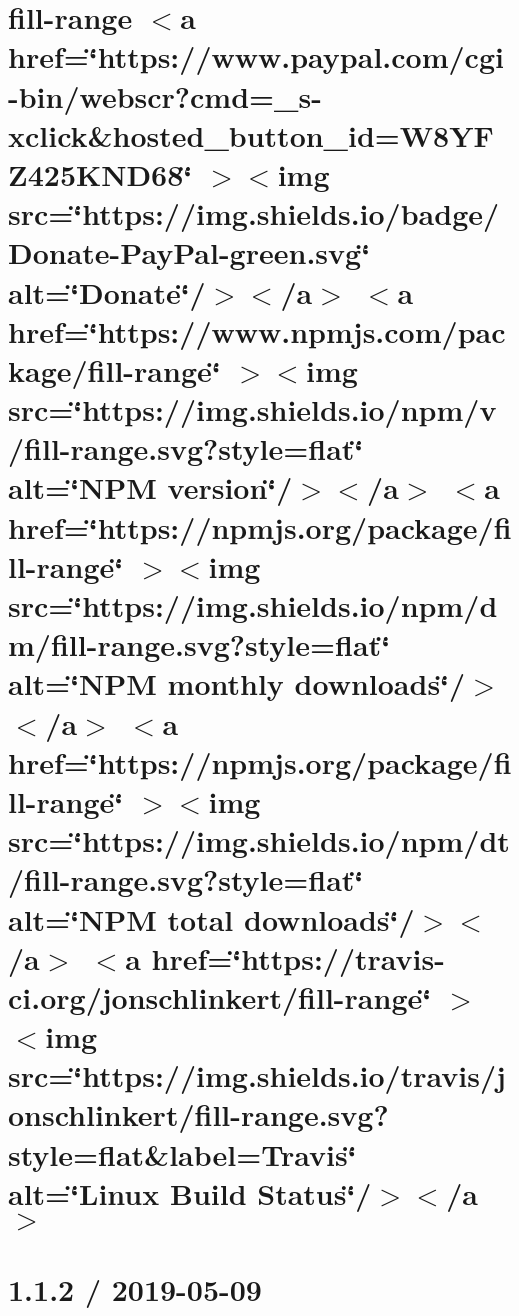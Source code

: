 \documentclass[twoside]{book}
\newcommand{\+}{\discretionary{\mbox{\scriptsize$\hookleftarrow$}}{}{}}
\begin{document}
\chapter{fill-\/range \texorpdfstring{$<$}{<}a href=\char`\"{}https\+://www.\+paypal.\+com/cgi-\/bin/webscr?cmd=\+\_\+s-\/xclick\&hosted\+\_\+button\+\_\+id=\+W8\+YFZ425\+KND68\char`\"{} \texorpdfstring{$>$}{>}\texorpdfstring{$<$}{<}img src=\char`\"{}https\+://img.\+shields.\+io/badge/\+Donate-\/\+Pay\+Pal-\/green.\+svg\char`\"{} alt=\char`\"{}\+Donate\char`\"{}/\texorpdfstring{$>$}{>}\texorpdfstring{$<$}{<}/a\texorpdfstring{$>$}{>} \texorpdfstring{$<$}{<}a href=\char`\"{}https\+://www.\+npmjs.\+com/package/fill-\/range\char`\"{} \texorpdfstring{$>$}{>}\texorpdfstring{$<$}{<}img src=\char`\"{}https\+://img.\+shields.\+io/npm/v/fill-\/range.\+svg?style=flat\char`\"{} alt=\char`\"{}\+NPM version\char`\"{}/\texorpdfstring{$>$}{>}\texorpdfstring{$<$}{<}/a\texorpdfstring{$>$}{>} \texorpdfstring{$<$}{<}a href=\char`\"{}https\+://npmjs.\+org/package/fill-\/range\char`\"{} \texorpdfstring{$>$}{>}\texorpdfstring{$<$}{<}img src=\char`\"{}https\+://img.\+shields.\+io/npm/dm/fill-\/range.\+svg?style=flat\char`\"{} alt=\char`\"{}\+NPM monthly downloads\char`\"{}/\texorpdfstring{$>$}{>}\texorpdfstring{$<$}{<}/a\texorpdfstring{$>$}{>} \texorpdfstring{$<$}{<}a href=\char`\"{}https\+://npmjs.\+org/package/fill-\/range\char`\"{} \texorpdfstring{$>$}{>}\texorpdfstring{$<$}{<}img src=\char`\"{}https\+://img.\+shields.\+io/npm/dt/fill-\/range.\+svg?style=flat\char`\"{} alt=\char`\"{}\+NPM total downloads\char`\"{}/\texorpdfstring{$>$}{>}\texorpdfstring{$<$}{<}/a\texorpdfstring{$>$}{>} \texorpdfstring{$<$}{<}a href=\char`\"{}https\+://travis-\/ci.\+org/jonschlinkert/fill-\/range\char`\"{} \texorpdfstring{$>$}{>}\texorpdfstring{$<$}{<}img src=\char`\"{}https\+://img.\+shields.\+io/travis/jonschlinkert/fill-\/range.\+svg?style=flat\&label=\+Travis\char`\"{} alt=\char`\"{}\+Linux Build Status\char`\"{}/\texorpdfstring{$>$}{>}\texorpdfstring{$<$}{<}/a\texorpdfstring{$>$}{>}}
\label{md__c___users_vaishnavi_jadhav__desktop__developer_code_mean_stack_example_client_node_modules_fill_range__r_e_a_d_m_e}

\chapter{1.1.2 / 2019-\/05-\/09}
\label{md__c___users_vaishnavi_jadhav__desktop__developer_code_mean_stack_example_client_node_modules_finalhandler__h_i_s_t_o_r_y}

\end{document}
